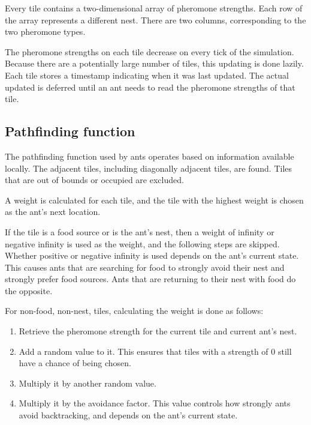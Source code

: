 \documentclass{article}
\begin{document}
Every tile contains a two-dimensional array of pheromone strengths.  Each row of the array represents a different nest.  There are two columns, corresponding to the two pheromone types.

The pheromone strengths on each tile decrease on every tick of the simulation.  Because there are a potentially large number of tiles, this updating is done lazily.  Each tile stores a timestamp indicating when it was last updated.  The actual updated is deferred until an ant needs to read the pheromone strengths of that tile.

\subsection{Pathfinding function}

The pathfinding function used by ants operates based on information available locally.  The adjacent tiles, including diagonally adjacent tiles, are found.  Tiles that are out of bounds or occupied are excluded.

A weight is calculated for each tile, and the tile with the highest weight is chosen as the ant's next location.

If the tile is a food source or is the ant's nest, then a weight of infinity or negative infinity is used as the weight, and the following steps are skipped.  Whether positive or negative infinity is used depends on the ant's current state.  This causes ants that are searching for food to strongly avoid their nest and strongly prefer food sources.  Ants that are returning to their nest with food do the opposite.

For non-food, non-nest, tiles, calculating the weight is done as follows:

\begin{enumerate}

    \item Retrieve the pheromone strength for the current tile and current ant's nest.
    \item Add a random value to it.  This ensures that tiles with a strength of 0 still have a chance of being chosen.
    \item Multiply it by another random value.
    \item Multiply it by the avoidance factor.  This value controls how strongly ants avoid backtracking, and depends on the ant's current state.

\end{enumerate}
\end{document}
